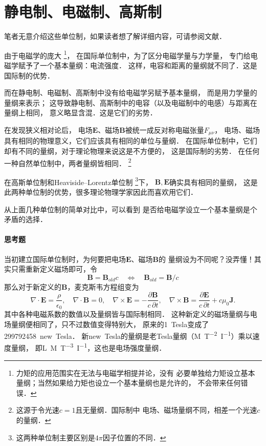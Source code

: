 \section{静电制、电磁制、高斯制}

笔者无意介绍这些单位制，如果读者想了解详细内容，可请参阅文献\parencite{liang_cao2020}．

    由于电磁学的庞大
{\footnote{力矩的应用范围实在无法与电磁学相提并论，没有
        必要单独给力矩设立基本量纲；当然如果给力矩也设立一个基本量纲也是允许的，
        不会带来任何错误．}}，
    在国际单位制中，为了区分电磁学量与力学量，
    专门给电磁学赋予了一个基本量纲：电流强度．
    这样，电容和距离的量纲就不同了．这是国际制的优势．


    而在静电制、电磁制、高斯制中没有给电磁学另赋予基本量纲，
    而是用力学量的量纲来表示；
    这导致静电制、高斯制中的电容（以及电磁制中的电感）与距离在量纲上相同，
    意义略显含混．这是它们的劣势．

    在发现狭义相对论后，
    电场$\boldsymbol{E}$、磁场$\boldsymbol{B}$被统一成反对称电磁张量$F_{\mu\nu}$，
    电场、磁场具有相同的物理意义，它们应该具有相同的单位与量纲．
    在国际单位制中，它们却有不同的量纲，对于理论物理来说这是不方便的，
    这是国际制的劣势．
    在任何一种自然单位制中，两者量纲皆相同．
    {\footnote{这源于令光速$c=1$且无量纲．国际制中
            电场、磁场量纲不同，相差一个光速$c$的量纲．}}



    在高斯单位制和Heaviside--Lorentz单位制
    {\footnote{这两种单位制主要区别是$4\pi$因子位置的不同．}}下，
    $\boldsymbol{B,E}$确实具有相同的量纲，
    这是此两种单位制的优势，很多理论物理学家因此而喜欢用它们．


    从上面几种单位制的简单对比中，可以看到
    是否给电磁学设立一个基本量纲是个矛盾的选择．

\paragraph{思考题}
当初建立国际单位制时，为何要把电场$\boldsymbol{E}$、磁场$\boldsymbol{B}$的
量纲设为不同呢？没弄懂！其实只需重新定义磁场即可，令
\begin{equation*}
    \boldsymbol{B} =  \boldsymbol{B}_{old} c \quad \Leftrightarrow \quad
    \boldsymbol{B}_{old} = \boldsymbol{B}/c
\end{equation*}
那么对于新定义的$\boldsymbol{B}$，麦克斯韦方程组变为
\begin{equation*}
    \nabla \cdot  \boldsymbol{E} = \dfrac{\rho }{\epsilon_0 }, \quad
    \nabla \cdot  \boldsymbol{B} = 0,  \quad
    \nabla \times \boldsymbol{E} = -\frac{\partial \boldsymbol{B}}{c\, \partial t} , \quad
    \nabla \times \boldsymbol{B} = \frac{\partial \boldsymbol{E}}{c\, \partial t}
                + {c\mu_0}\boldsymbol{J}.
\end{equation*}
其中各种电磁系数的数值以及量纲皆与国际制相同．
这种新定义的磁场量纲与电场量纲便相同了，只不过数值变得特别大，
原来的\SI{1}{Tesla}变成了\SI{299792458}{new Tesla}．
新\si{new Tesla}的量纲是老\si{Tesla}量纲（\si{M^{}T^{-2}I^{-1}}）乘以速度量纲，
即\si{L^{}M^{}T^{-3}I^{-1}}，这也是电场强度量纲．

